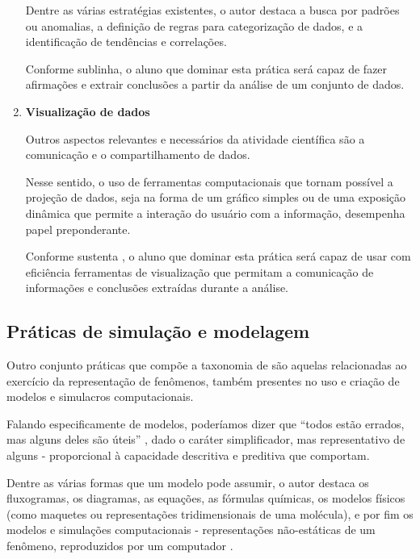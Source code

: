 \begin{enumerate}
  Dentre as várias estratégias existentes, o autor destaca a busca por padrões ou anomalias, a definição de regras para categorização de dados, e a identificação de tendências e correlações. 

  Conforme sublinha, o aluno que dominar esta prática será capaz de fazer afirmações e extrair conclusões a partir da análise de um conjunto de dados.


  \item \textbf{Visualização de dados}

  Outros aspectos relevantes e necessários da atividade científica são a comunicação e o compartilhamento de dados.

  Nesse sentido, o uso de ferramentas computacionais que tornam possível a projeção de dados, seja na forma de um gráfico simples ou de uma exposição dinâmica que permite a interação do usuário com a informação, desempenha papel preponderante.

  Conforme sustenta , o aluno que dominar esta prática será capaz de usar com eficiência ferramentas de visualização que permitam a comunicação de informações e conclusões extraídas durante a análise.

\end{enumerate}

\subsection{Práticas de simulação e modelagem}\label{praticas-de-simulacao-e-modelagem}

Outro conjunto práticas que compõe a taxonomia de  são aquelas relacionadas ao exercício da representação de fenômenos, também presentes no uso e criação de modelos e simulacros computacionais. 

Falando especificamente de modelos, poderíamos dizer que ``todos estão errados, mas alguns deles são úteis'' , dado o caráter simplificador, mas representativo de alguns - proporcional à capacidade descritiva e preditiva que comportam. 

Dentre as várias formas que um modelo pode assumir, o autor destaca os fluxogramas, os diagramas, as equações, as fórmulas químicas, os modelos físicos (como maquetes ou representações tridimensionais de uma molécula), e por fim os modelos e simulações computacionais - representações não-estáticas de um fenômeno, reproduzidos por um computador \cite{Weintrop2016}.

